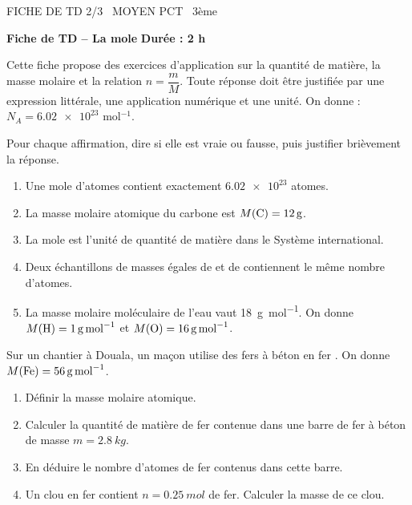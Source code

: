 \documentclass[11pt]{article}
\begin{document}
\begin{tcolorbox}[enhanced,colback=popink,colframe=popink,arc=10pt,boxrule=0pt,left=12pt,right=12pt,top=9pt,bottom=9pt]
{\color{white}\popxbold\small FICHE DE TD 2/3 \textbullet\ MOYEN \hfill PCT \textbullet\ 3ème\par}
\end{tcolorbox}
\vspace{4pt}
\textbf{Fiche de TD -- La mole} \hfill \textbf{Durée : 2 h}

Cette fiche propose des exercices d'application sur la quantité de matière, la masse molaire et la relation $n = \dfrac{m}{M}$. Toute réponse doit être justifiée par une expression littérale, une application numérique et une unité. On donne : $N_A = \num{6,02e23}$ mol$^{-1}$.

\begin{exercice}
Pour chaque affirmation, dire si elle est vraie ou fausse, puis justifier brièvement la réponse.
\begin{enumerate}
\item Une mole d'atomes contient exactement $\num{6,02e23}$ atomes.
\item La masse molaire atomique du carbone est $M(\ce{C}) = \SI{12}{g}$. 
\item La mole est l'unité de quantité de matière dans le Système international.
\item Deux échantillons de masses égales de  et de  contiennent le même nombre d'atomes.
\item La masse molaire moléculaire de l'eau  vaut \SI{18}{g.mol^{-1}}. On donne $M(\ce{H}) = \SI{1}{g.mol^{-1}}$ et $M(\ce{O}) = \SI{16}{g.mol^{-1}}$.
\end{enumerate}
\end{exercice}

\begin{exercice}
Sur un chantier à Douala, un maçon utilise des fers à béton en fer . On donne $M(\ce{Fe}) = \SI{56}{g.mol^{-1}}$.
\begin{enumerate}
\item Définir la masse molaire atomique.
\item Calculer la quantité de matière de fer contenue dans une barre de fer à béton de masse $m = \SI{2,8}{kg}$.
\item En déduire le nombre d'atomes de fer contenus dans cette barre.
\item Un clou en fer contient $n = \SI{0,25}{mol}$ de fer. Calculer la masse de ce clou.
\end{enumerate}
\end{exercice}
\end{document}

